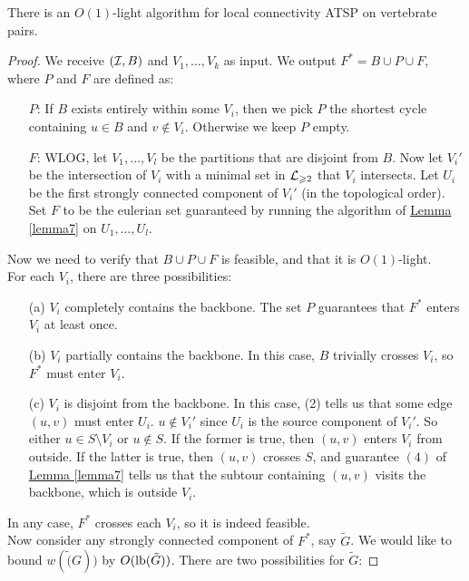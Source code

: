 \documentclass[./main.tex]{subfiles}
\begin{document}
		\begin{theorem}
			There is an $O(1)$-light algorithm for local connectivity ATSP on vertebrate pairs.
		\end{theorem}
		\begin{proof}
			We receive $(\mathcal{I},B)$ and $V_1,\ldots,V_k$ as input. We output $F^*=B\cup P\cup F$, where $P$ and $F$ are defined as:
			\begin{enumerate}
				\item[$P$:] If $B$ exists entirely within some $V_i$, then we pick $P$ the shortest cycle containing $u\in B$ and $v\notin V_i$. Otherwise we keep $P$ empty.
				\item[$F$:] WLOG, let $V_1,\ldots,V_l$ be the partitions that are disjoint from $B$. Now let $V_i'$ be the intersection of $V_i$ with a minimal set in $\mathcal{L}_{\geqslant 2}$ that $V_i$ intersects. Let $U_i$ be the first strongly connected component of $V_i'$ (in the topological order). Set $F$ to be the eulerian set guaranteed by running the algorithm of \hyperref[lemma7]{Lemma \ref{lemma7}} on $U_1,\ldots,U_l$.
			\end{enumerate}\vspace{2mm}
			Now we need to verify that $B\cup P\cup F$ is feasible, and that it is $O(1)$-light.
			\\For each $V_i$, there are three possibilities:
			\begin{enumerate}
				\item[(a)] $V_i$ completely contains the backbone. The set $P$ guarantees that $F^*$ enters $V_i$ at least once.
				\item[(b)] $V_i$ partially contains the backbone. In this case, $B$ trivially crosses $V_i$, so $F^*$ must enter $V_i$.
				\item[(c)] $V_i$ is disjoint from the backbone. In this case, (2) tells us that some edge $(u,v)$ must enter $U_i$. $u\notin V_i'$ since $U_i$ is the source component of $V_i'$. So either $u\in S\setminus V_i$ or $u\notin S$. If the former is true, then $(u,v)$ enters $V_i$ from outside. If the latter is true, then $(u,v)$ crosses $S$, and guarantee $(4)$ of \hyperref[lemma7]{Lemma \ref{lemma7}} tells us that the subtour containing $(u,v)$ visits the backbone, which is outside $V_i$.
			\end{enumerate}
			In any case, $F^*$ crosses each $V_i$, so it is indeed feasible.\\\vspace{2mm}
			Now consider any strongly connected component of $F^*$, say $\tilde{G}$. We would like to bound $w(\tilde(G))$ by $O(\textup{lb}(\tilde{G}))$. There are two possibilities for $\tilde{G}$:

\end{proof}
\end{document}
